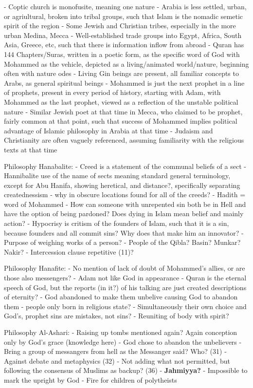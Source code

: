 \documentclass[11 pt, twoside]{article}
\begin{document}
		- Coptic church is monofusite, meaning one nature
	- Arabia is less settled, urban, or agriultural, broken into tribal groups, such that Islam is the nomadic semetic spirit of the region
		- Some Jewish and Christian tribes, especially in the more urban Medina, Mecca
		- Well-established trade groups into Egypt, Africa, South Asia, Greece, etc, such that there is information inflow from abroad
- Quran has 144 Chapters/Suras, written in a poetic form, as the specific word of God with Mohammed as the vehicle, depicted as a living/animated world/nature, beginning often with nature odes
	- Living Gin beings are present, all familiar concepts to Arabs, as general spiritual beings
	- Mohammed is just the next prophet in a line of prophets, present in every period of history, starting with Adam, with Mohammed as the last prophet, viewed as a reflection of the unstable political nature
	- Similar Jewish poet at that time in Mecca, who claimed to be prophet, fairly common at that point, such that success of Mohammed implies political advantage of Islamic philosophy in Arabia at that time
	- Judaism and Christianity are often vaguely referenced, assuming familiarity with the religious texts at that time

Philosophy Hanabalite:
- Creed is a statement of the communal beliefs of a sect
- Hannibalite use of the name of sects meaning standard general terminology, except for Abu Hanifa, showing heretical, and distance?, specifically separating creatednessism
- why in obscure locations found for all of the creeds?
- Hadith = word of Mohammed
- How can someone with unrepented sin both be in Hell and have the option of being pardoned? Does dying in Islam mean belief and mainly action?
- Hypocrisy is critism of the founders of Islam, such that it is a sin, because founders and all commit sins? Why does that make him an innovator?
- Purpose of weighing works of a person?
- People of the Qibla? Basin? Munkar? Nakir?
- Intercession clause repetitive (11)?

Philosophy Hanafite:
- No mention of lack of doubt of Mohammed's allies, or are those also messengers?
- Adam not like God in appearance
- Quran is the eternal speech of God, but the reports (in it?) of his talking are just created descriptions of eternity?
- God abandoned to make them unbelive causing God to abandon them - people only born in religious state?
- Simultaneously their own choice and God's, prophet sins are mistakes, not sins?
- Reuniting of body with spirit?

Philosophy Al-Ashari:
- Raising up tombs mentioned again? Again conception only by God's grace (knowledge here)
- God chose to abandon the unbelievers
- Bring a group of messangers from hell as the Messanger said? Who? (31)
- Against debate and metaphysics (32)
- Not adding what not permitted, but following the consensus of Muslims as backup? (36)
- \textbf{Jahmiyya?}
- Impossible to mark the upright by God
- Fire for children of polytheists
\end{document}
